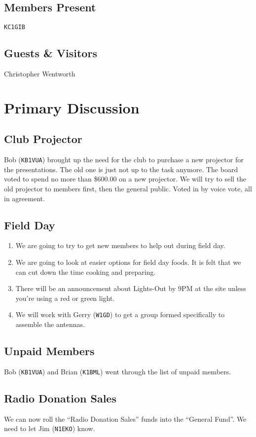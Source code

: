 \documentclass[10pt,letterpaper]{article}
\begin{document}
\subsection{Members Present}
\texttt{KC1GIB}

\subsection{Guests \& Visitors}
Christopher Wentworth

\section{Primary Discussion}

\subsection{Club Projector}
Bob (\texttt{KB1VUA}) brought up the need for the club to purchase a new projector for the presentations. The old one is just not up to the task anymore. The board voted to spend no more than \$600.00 on a new projector. We will try to sell the old projector to members first, then the general public. Voted in by voice vote, all in agreement.

\subsection{Field Day}
\begin{enumerate}
  \item We are going to try to get new members to help out during field day.
  \item We are going to look at easier options for field day foods. It is felt that we can cut down the time cooking and preparing.
  \item There will be an announcement about Lights-Out by 9PM at the site unless you're using a red or green light.
  \item We will work with Gerry (\texttt{W1GD}) to get a group formed specifically to assemble the antennas.
\end{enumerate}

\subsection{Unpaid Members}
Bob (\texttt{KB1VUA}) and Brian (\texttt{K1BML}) went through the list of unpaid members.

\subsection{Radio Donation Sales}
We can now roll the ``Radio Donation Sales'' funds into the ``General Fund''. We need to let Jim (\texttt{N1EKO}) know.
\end{document}

